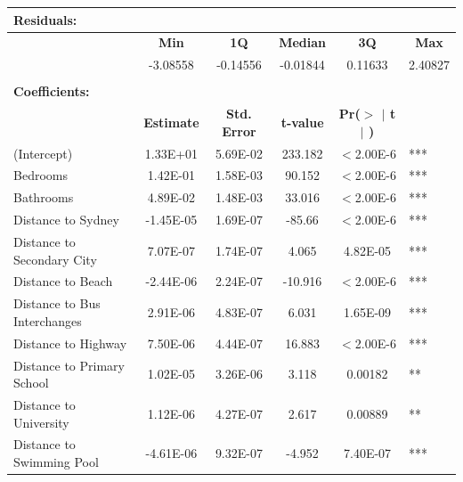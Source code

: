 \renewcommand{\baselinestretch}{0.8}
\begin{table}[!ht]
  \centering \small
    \begin{tabular}{lccccc}
    \textbf{Residuals:} &       &       &       &       &  \\
    \midrule
          & \multicolumn{1}{c}{\textbf{Min}} & \multicolumn{1}{c}{\textbf{1Q}} & \multicolumn{1}{c}{\textbf{Median}} & \multicolumn{1}{c}{\textbf{3Q}} & \multicolumn{1}{c}{\textbf{Max}} \\
          & -3.08558 & -0.14556 & -0.01844 & 0.11633 & 2.40827 \\
          &       &       &       &       &  \\
    \textbf{Coefficients:} &       &       &       &       &  \\
    \midrule
          & \multicolumn{1}{c}{\textbf{Estimate}} & \multicolumn{1}{c}{\textbf{Std. Error}} & \multicolumn{1}{c}{\textbf{t-value}} & \multicolumn{1}{c}{\textbf{Pr($>$ $|$ t $|$ )}} &  \\
    (Intercept) & 1.33E+01 & 5.69E-02 & 233.182 & \multicolumn{1}{c}{$<$2.00E-6} & \multicolumn{1}{l}{***} \\
    Bedrooms & 1.42E-01 & 1.58E-03 & 90.152 & \multicolumn{1}{c}{$<$2.00E-6} & \multicolumn{1}{l}{***} \\
    Bathrooms & 4.89E-02 & 1.48E-03 & 33.016 & \multicolumn{1}{c}{$<$2.00E-6} & \multicolumn{1}{l}{***} \\
    Distance to Sydney & -1.45E-05 & 1.69E-07 & -85.66 & \multicolumn{1}{c}{$<$2.00E-6} & \multicolumn{1}{l}{***} \\
    Distance to Secondary City & 7.07E-07 & 1.74E-07 & 4.065 & 4.82E-05 & \multicolumn{1}{l}{***} \\
    Distance to Beach & -2.44E-06 & 2.24E-07 & -10.916 & \multicolumn{1}{c}{$<$2.00E-6} & \multicolumn{1}{l}{***} \\
    Distance to Bus Interchanges & 2.91E-06 & 4.83E-07 & 6.031 & 1.65E-09 & \multicolumn{1}{l}{***} \\
    Distance to Highway & 7.50E-06 & 4.44E-07 & 16.883 & \multicolumn{1}{c}{$<$2.00E-6} & \multicolumn{1}{l}{***} \\
    Distance to Primary School & 1.02E-05 & 3.26E-06 & 3.118 & 0.00182 & \multicolumn{1}{l}{**} \\
    Distance to University & 1.12E-06 & 4.27E-07 & 2.617 & 0.00889 & \multicolumn{1}{l}{**} \\
    Distance to Swimming Pool & -4.61E-06 & 9.32E-07 & -4.952 & 7.40E-07 & \multicolumn{1}{l}{***} \\

\end{tabular}
\end{table}
